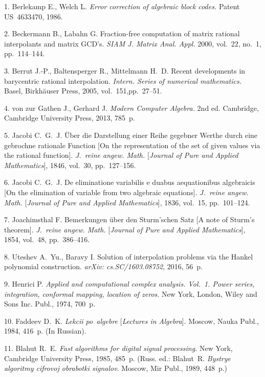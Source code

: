 

{\footnotesize

\vskip 3mm


\vskip 2mm

1. Berlekamp E., Welch L. \textit{Error correction of algebraic
block codes.} Patent US~4633470, 1986.

2. Beckermann B., Labahn G. Fraction-free computation of matrix
rational interpolants and matrix GCD's. \textit{SIAM J. Matrix
Anal. Appl.} 2000, vol.~22, no.~1, pp.~114--144.

3. Berrut J.-P., Baltensperger R., Mittelmann H.~D. Recent
developments in barycentric rational interpolation.
\textit{Intern. Series of numerical mathematics.} Basel,
Birkh\"auser Press, 2005, vol.~151,\linebreak pp.~27--51.

4. von zur Gathen J., Gerhard J. \textit{Modern Computer Algebra.}
2nd ed. Cambridge, Cambridge University Press, 2013, 785~p.

5. Jacobi C.~G.~J. \"Uber die Darstellung einer Reihe gegebner
Werthe durch eine gebrochne rationale Function [On the
representation of the set of given values via the rational
function]. \textit{J.~reine angew. Math.} [{\it Journal of Pure
and Applied Mathematics}], 1846, vol.~30, pp.~127--156.

6. Jacobi C.~G.~J. De eliminatione variabilis e duabus
aequationibus algebraicis [On the elimination of variable from two
algebraic equations]. \textit{J.~reine angew. Math.} [{\it Journal
of Pure and Applied Mathematics}], 1836, vol.~15, pp.~101--124.

7. Joachimsthal F. Bemerkungen \"uber den Sturm'schen Satz [A note
of Sturm's theorem]. \textit{J.~reine angew. Math.}  [{\it Journal
of Pure and Applied Mathematics}], 1854, vol.~48, pp.~386--416.

8. Uteshev A.~Yu., Baravy I. Solution of interpolation problems
via the Hankel polynomial construction. \emph{arXiv:
cs.SC/1603.08752}, 2016, 56~p.

9. Henrici P. \textit{Applied and computational complex analysis.
Vol.~1. Power series, integration, conformal mapping, location of
zeros}. New York, London, Wiley and Sons Inc. Publ., 1974, 700~p.

10. Faddeev D.~K. \emph{Lekcii po~algebre} [\emph{Lectures in
Algebra}]. Moscow, Nauka Publ., 1984, 416~p. (In Russian).

11. Blahut R.~E. \textit{Fast algorithms for digital signal
processing.} New York, Cambridge University Press, 1985, 485~p.
(Russ. ed.: Blahut~R. \emph{Bystrye algoritmy cifrovoj obrabotki
signalov}. Moscow, Mir Publ., 1989, 448~p.)

}
